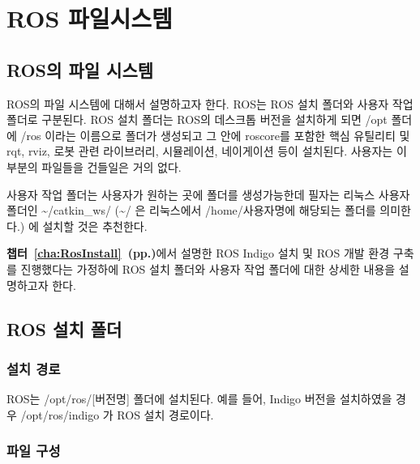 \section{ROS 파일시스템}

\subsection{ROS의 파일 시스템}
ROS의 파일 시스템에 대해서 설명하고자 한다. ROS는 ROS 설치 폴더와 사용자 작업 폴더로 구분된다. 
ROS 설치 폴더는 ROS의 데스크톱 버전을 설치하게 되면 /opt 폴더에 /ros 이라는 이름으로 폴더가 생성되고 그 안에 roscore를 포함한 핵심 유틸리티 및 rqt, rviz, 로봇 관련 라이브러리, 시뮬레이션, 네이게이션 등이 설치된다. 사용자는 이 부분의 파일들을 건들일은 거의 없다. 

사용자 작업 폴더는 사용자가 원하는 곳에 폴더를 생성가능한데 필자는 리눅스 사용자 폴더인 \textasciitilde/catkin\_ws/ (\textasciitilde/ 은 리눅스에서 /home/사용자명에 해당되는 폴더를 의미한다.) 에 설치할 것은 추천한다. 

\textbf{챕터~\ref{cha:RosInstall}~(pp.\pageref{ha:RosInstall})}에서 설명한 ROS Indigo 설치 및 ROS 개발 환경 구축를 진행했다는 가정하에 ROS 설치 폴더와 사용자 작업 폴더에 대한 상세한 내용을 설명하고자 한다.

\subsection{ROS 설치 폴더}

\subsubsection{설치 경로}

ROS는 /opt/ros/[버전명] 폴더에 설치된다. 예를 들어, Indigo 버전을 설치하였을 경우 /opt/ros/indigo 가 ROS 설치 경로이다.

\subsubsection{파일 구성}

